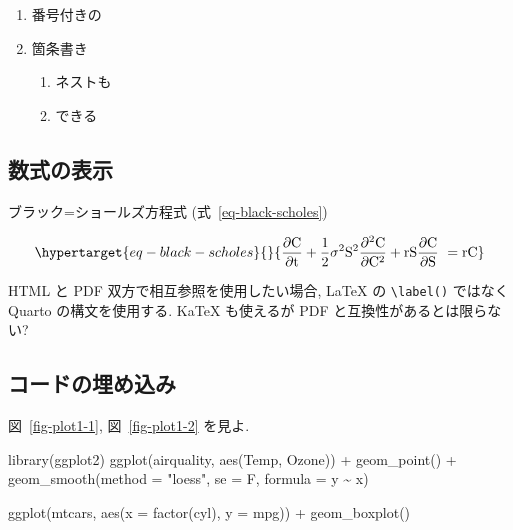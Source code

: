 \documentclass[
  letterpaper,
  DIV=11,
  pandoc,
  ja=standard,
  jafont=noto-otf]{bxjsarticle}
\newenvironment{Shaded}{\begin{snugshade}}{\end{snugshade}}
\newcommand{\AttributeTok}[1]{\textcolor[rgb]{0.00,0.48,0.65}{#1}}
\newcommand{\FunctionTok}[1]{\textcolor[rgb]{0.28,0.35,0.67}{#1}}
\newcommand{\NormalTok}[1]{\textcolor[rgb]{0.00,0.48,0.65}{#1}}
\newcommand{\SpecialCharTok}[1]{\textcolor[rgb]{0.37,0.37,0.37}{#1}}
\newcommand{\StringTok}[1]{\textcolor[rgb]{0.13,0.47,0.30}{#1}}
\providecommand{\tightlist}{%
  \setlength{\itemsep}{0pt}\setlength{\parskip}{0pt}}
\begin{document}
\begin{enumerate}
\def\labelenumi{\arabic{enumi}.}
\tightlist
\item
  番号付きの
\item
  箇条書き

  \begin{enumerate}
  \def\labelenumii{\arabic{enumii}.}
  \tightlist
  \item
    ネストも
  \item
    できる
  \end{enumerate}
\end{enumerate}

\hypertarget{ux6570ux5f0fux306eux8868ux793a}{%
\subsection{数式の表示}\label{ux6570ux5f0fux306eux8868ux793a}}

ブラック=ショールズ方程式 (式~\ref{eq-black-scholes})

\begin{equation}\protect\hypertarget{eq-black-scholes}{}{
\frac{\partial \mathrm C}{ \partial \mathrm t } + \frac{1}{2}\sigma^{2} \mathrm S^{2}
\frac{\partial^{2} \mathrm C}{\partial \mathrm C^2}
  + \mathrm r \mathrm S \frac{\partial \mathrm C}{\partial \mathrm S}\ =
  \mathrm r \mathrm C 
}\label{eq-black-scholes}\end{equation}

HTML と PDF 双方で相互参照を使用したい場合, LaTeX の
\texttt{\textbackslash{}label()} ではなく Quarto の構文を使用する. KaTeX
も使えるが PDF と互換性があるとは限らない?

\hypertarget{ux30b3ux30fcux30c9ux306eux57cbux3081ux8fbcux307f}{%
\subsection{コードの埋め込み}\label{ux30b3ux30fcux30c9ux306eux57cbux3081ux8fbcux307f}}

図~\ref{fig-plot1-1}, 図~\ref{fig-plot1-2} を見よ.

\begin{Shaded}
\begin{Highlighting}[]
\FunctionTok{library}\NormalTok{(ggplot2)}
\FunctionTok{ggplot}\NormalTok{(airquality, }\FunctionTok{aes}\NormalTok{(Temp, Ozone)) }\SpecialCharTok{+} 
        \FunctionTok{geom\_point}\NormalTok{() }\SpecialCharTok{+} 
        \FunctionTok{geom\_smooth}\NormalTok{(}\AttributeTok{method =} \StringTok{"loess"}\NormalTok{, }\AttributeTok{se =}\NormalTok{ F, }\AttributeTok{formula =}\NormalTok{ y }\SpecialCharTok{\textasciitilde{}}\NormalTok{ x)}

\FunctionTok{ggplot}\NormalTok{(mtcars, }\FunctionTok{aes}\NormalTok{(}\AttributeTok{x =} \FunctionTok{factor}\NormalTok{(cyl), }\AttributeTok{y =}\NormalTok{ mpg)) }\SpecialCharTok{+} \FunctionTok{geom\_boxplot}\NormalTok{()}
\end{Highlighting}
\end{Shaded}
\end{document}
